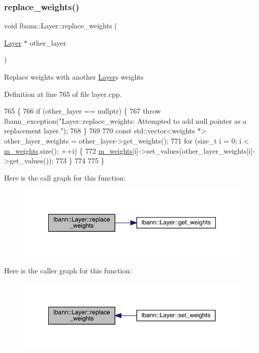 \subsubsection{\texorpdfstring{replace\+\_\+weights()}{replace\_weights()}}
{\footnotesize\ttfamily void lbann\+::\+Layer\+::replace\+\_\+weights (\begin{DoxyParamCaption}\item[{\hyperlink{classlbann_1_1Layer}{Layer} $\ast$}]{other\+\_\+layer }\end{DoxyParamCaption})}

Replace weights with another \hyperlink{classlbann_1_1Layer}{Layer}\textquotesingle{}s weights 

Definition at line 765 of file layer.\+cpp.


\begin{DoxyCode}
765                                               \{
766   \textcolor{keywordflow}{if} (other\_layer == \textcolor{keyword}{nullptr}) \{
767     \textcolor{keywordflow}{throw} lbann\_exception(\textcolor{stringliteral}{"Layer::replace\_weights: Attempted to add null pointer as a replacement layer."});
768   \}
769   
770   \textcolor{keyword}{const} std::vector<weights *> other\_layer\_weights = other\_layer->get\_weights();
771   \textcolor{keywordflow}{for} (\textcolor{keywordtype}{size\_t} i = 0; i < \hyperlink{classlbann_1_1Layer_a7954e30fbf9100a6ba4b56d02767a469}{m\_weights}.size(); ++i) \{
772     \hyperlink{classlbann_1_1Layer_a7954e30fbf9100a6ba4b56d02767a469}{m\_weights}[i]->set\_values(other\_layer\_weights[i]->get\_values());
773   \}
774 
775 \}
\end{DoxyCode}
Here is the call graph for this function\+:\nopagebreak
\begin{figure}[H]
\begin{center}
\leavevmode
\includegraphics[width=350pt]{classlbann_1_1Layer_ae9df4e0b0fe7c276c79575f9e11c53af_cgraph}
\end{center}
\end{figure}
Here is the caller graph for this function\+:\nopagebreak
\begin{figure}[H]
\begin{center}
\leavevmode
\includegraphics[width=350pt]{classlbann_1_1Layer_ae9df4e0b0fe7c276c79575f9e11c53af_icgraph}
\end{center}
\end{figure}
